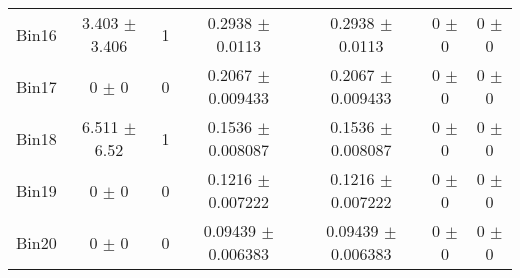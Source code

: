 \begin{tabular}{@{\extracolsep{4pt}}lcccccc@{}}
     Bin16 & 3.403 $\pm$ 3.406 & 1 & 0.2938 $\pm$ 0.0113 & 0.2938 $\pm$ 0.0113 & 0 $\pm$ 0 & 0 $\pm$ 0 \\ 
     Bin17 & 0 $\pm$ 0 & 0 & 0.2067 $\pm$ 0.009433 & 0.2067 $\pm$ 0.009433 & 0 $\pm$ 0 & 0 $\pm$ 0 \\ 
     Bin18 & 6.511 $\pm$ 6.52 & 1 & 0.1536 $\pm$ 0.008087 & 0.1536 $\pm$ 0.008087 & 0 $\pm$ 0 & 0 $\pm$ 0 \\ 
     Bin19 & 0 $\pm$ 0 & 0 & 0.1216 $\pm$ 0.007222 & 0.1216 $\pm$ 0.007222 & 0 $\pm$ 0 & 0 $\pm$ 0 \\ 
     Bin20 & 0 $\pm$ 0 & 0 & 0.09439 $\pm$ 0.006383 & 0.09439 $\pm$ 0.006383 & 0 $\pm$ 0 & 0 $\pm$ 0 \\ 
\hline\hline
  \end{tabular}

